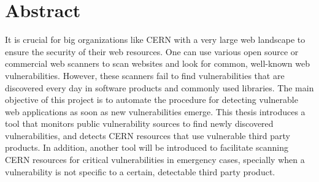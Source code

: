\chapter*{Abstract}
\thispagestyle{empty}

It is crucial for big organizations like CERN with a very large web landscape to ensure the security of their web resources. One can use various open source or commercial web scanners to scan websites and look for common, well-known web vulnerabilities. However, these scanners fail to find vulnerabilities that are discovered every day in software products and commonly used libraries. The main objective of this project is to automate the procedure for detecting vulnerable web applications as soon as new vulnerabilities emerge. This thesis introduces a tool that monitors public vulnerability sources to find newly discovered vulnerabilities, and detects CERN resources that use vulnerable third party products. In addition, another tool will be introduced to facilitate scanning CERN resources for critical vulnerabilities in emergency cases, specially when a vulnerability is not specific to a certain, detectable third party product.